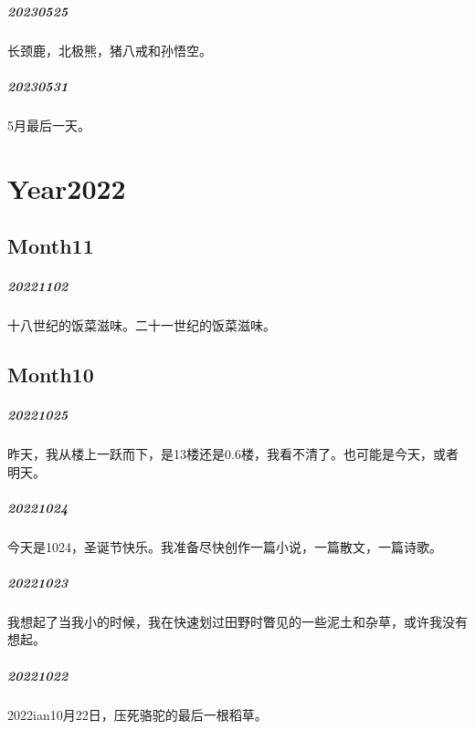 \documentclass[UTF8]{Diaries}
\begin{document}
\paragraph{20230525}
长颈鹿，北极熊，猪八戒和孙悟空。

\paragraph{20230531}
5月最后一天。







\chapter{Year2022}


\section{Month11}
\paragraph{20221102}
十八世纪的饭菜滋味。二十一世纪的饭菜滋味。

\section{Month10}

\paragraph{20221025}
昨天，我从楼上一跃而下，是13楼还是0.6楼，我看不清了。也可能是今天，或者明天。

\paragraph{20221024}
今天是1024，圣诞节快乐。我准备尽快创作一篇小说，一篇散文，一篇诗歌。

\paragraph{20221023}
我想起了当我小的时候，我在快速划过田野时瞥见的一些泥土和杂草，或许我没有想起。

\paragraph{20221022}
2022ian10月22日，压死骆驼的最后一根稻草。
\end{document}
